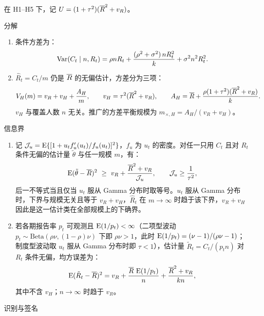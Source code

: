 \begin{proposition}[报告率波动下的方差三分量]
\label{prop:report-noise}
在 H1--H5 下，记 $U=(1+\tau^2)(\overline{R}^2+v_R)$。

\noindent\textsf{分解}
\begin{enumerate}[label=(\roman*)]
  \item 条件方差为：
  \begin{equation}
    \operatorname{Var}(C_t\mid n,R_t)=\rho nR_t+\frac{(\rho^2+\sigma^2)\,nR_t^2}{k}+\sigma^2n^2R_t^2 .
    \label{eq:r3-var-cond}
  \end{equation}
  \item $\widehat R_t=C_t/m$ 仍是 $\overline{R}$ 的无偏估计，方差分为三项：
  \begin{equation}
    V_H(m)=v_R+v_H+\frac{A_H}{m},\qquad
    v_H=\tau^2(\overline{R}^2+v_R),\qquad
    A_H=\overline{R}+\frac{\rho(1+\tau^2)(\overline{R}^2+v_R)}{k}.
    \label{eq:r3-vH}
  \end{equation}
  $v_H$ 与覆盖人数 $n$ 无关。推广的方差平衡规模为 $m_{\times,H}=A_H/(v_R+v_H)$。
\end{enumerate}
\noindent\textsf{信息界}
\begin{enumerate}[label=(\roman*),resume]
  \item 记 $\mathcal J_u=\operatorname{E}\{[1+u_tf_u'(u_t)/f_u(u_t)]^2\}$，$f_u$ 为 $u_t$ 的密度。对任一只用 $C_t$ 且对 $R_t$ 条件无偏的估计量 $\tilde\theta$ 与任一规模 $m$，有：
  \begin{equation}
    \E(\tilde\theta-\Rbar)^2\ \geq\ v_R+\frac{\Rbar^2+v_R}{\mathcal J_u},\qquad \mathcal J_u\geq\frac{1}{\tau^2},
    \label{eq:r3-lb}
  \end{equation}
  后一不等式当且仅当 $u_t$ 服从 Gamma 分布时取等号。$u_t$ 服从 Gamma 分布时，下界与规模无关且等于 $v_R+v_H$，$\widehat R_t$ 在 $m\to\infty$ 时趋于该下界，$v_R+v_H$ 因此是这一估计类在全部规模上的下确界。
  \item 若各期报告率 $p_t$ 可观测且 $\operatorname{E}(1/p_t)<\infty$（二项型波动 $p_t\sim\mathrm{Beta}(\rho\nu,(1-\rho)\nu)$ 下即 $\rho\nu>1$，此时 $\operatorname{E}(1/p_t)=(\nu-1)/(\rho\nu-1)$；制度型波动取 $u_t$ 服从 Gamma 分布时即 $\tau<1$），估计量 $\tilde R_t=C_t/(p_tn)$ 对 $R_t$ 条件无偏，均方误差为：
  \begin{equation}
    \operatorname{E}(\tilde R_t-\overline{R})^2=v_R+\frac{\overline{R}\,\operatorname{E}(1/p_t)}{n}+\frac{\overline{R}^2+v_R}{kn},
    \label{eq:r3-obs}
  \end{equation}
  其中不含 $v_H$；$n\to\infty$ 时趋于 $v_R$。
\end{enumerate}
\noindent\textsf{识别与签名}
\begin{enumerate}[label=(\roman*),resume]

\end{enumerate}
\end{proposition}
